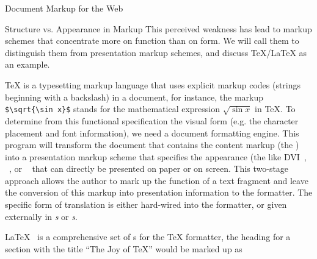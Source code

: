 \begin{omgroup}[id=markup-web]{Document Markup for the Web}
\begin{omgroup}[id=markup-types]{Structure vs. Appearance in Markup}
  This perceived weakness has lead to markup schemes that concentrate more on function
  than on form.  We will call them {} to distinguish them from
  presentation markup schemes, and discuss {}
  {\TeX}/{\LaTeX} {\cite{Knuth:ttb84,Lamport:ladps94}} as an example.

  {\TeX} is a typesetting markup language that uses explicit markup codes (strings
  beginning with a backslash) in a document, for instance, the markup
  {\verb|$\sqrt{\sin x}$|} stands for the mathematical expression $\sqrt{\sin x}$ in
  {\TeX}. To determine from this functional specification the visual form (e.g. the
  character placement and font information), we need a document formatting engine.  This
  program will transform the document that contains the content markup (the
  ) into a presentation markup
  scheme that specifies the appearance (the  like {DVI}~\cite{Knuth:ttb84},
  {}~\cite{Reid:plpd87}, or {}~\cite{PDFReference} that can
  directly be presented on paper or on screen.  This two-stage approach allows the author
  to mark up the function of a text fragment and leave the conversion of this markup into
  presentation information to the formatter. The specific form of translation is either
  hard-wired into the formatter, or given externally in {\emph{s}} or
  {\emph{s}}.

  {\LaTeX}~\cite{Lamport:ladps94} is a comprehensive set of s for the
  {\TeX} formatter, the heading for a section with the title ``The Joy of {\TeX}'' would
  be marked up as
\begin{small}
\begin{verbatim}

\end{verbatim}
\end{small}
\end{omgroup}
\end{omgroup}
